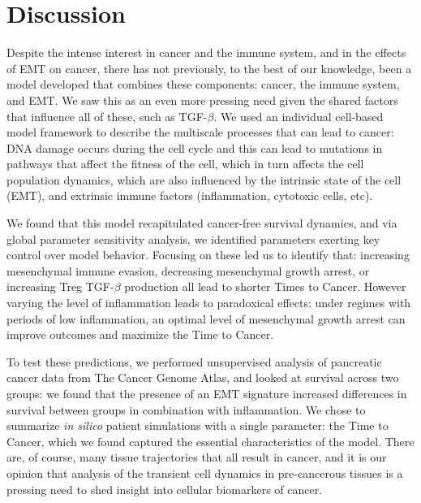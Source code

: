 \documentclass[11pt]{article}
\begin{document}
\section{Discussion}\label{Discussion}
Despite the intense interest in cancer and the immune system, and in the effects of EMT on cancer, there has not previously, to the best of our knowledge, been a model developed that combines these components: cancer, the immune system, and EMT. We saw this as an even more pressing need given the shared factors that influence all of these, such as TGF-$\beta$. We used an individual cell-based model framework to describe the multiscale processes that can lead to cancer: DNA damage occurs during the cell cycle and this can lead to mutations in pathways that affect the fitness of the cell, which in turn affects the cell population dynamics, which are also influenced by the intrinsic state of the cell (EMT), and extrinsic immune factors (inflammation, cytotoxic cells, etc).
\par
We found that this model recapitulated cancer-free survival dynamics, and via global parameter sensitivity analysis, we identified parameters exerting key control over model behavior. Focusing on these led us to identify that: increasing mesenchymal immune evasion, decreasing mesenchymal growth arrest, or increasing Treg TGF-$\beta$ production all lead to shorter Times to Cancer. However varying the level of inflammation leads to paradoxical effects: under regimes with periods of low inflammation, an optimal level of mesenchymal growth arrest can improve outcomes and maximize the Time to Cancer.
\par
To test these predictions, we performed unsupervised analysis of pancreatic cancer data from The Cancer Genome Atlas, and looked at survival across two groups: we found that the presence of an EMT signature increased differences in survival between groups in combination with inflammation. We chose to summarize {\em in silico} patient simulations with a single parameter: the Time to Cancer, which we found captured the essential characteristics of the model. There are, of course, many tissue trajectories that all result in cancer, and it is our opinion that analysis of the transient cell dynamics in pre-cancerous tissues is a pressing need to shed insight into cellular biomarkers of cancer.
\par
\end{document}
